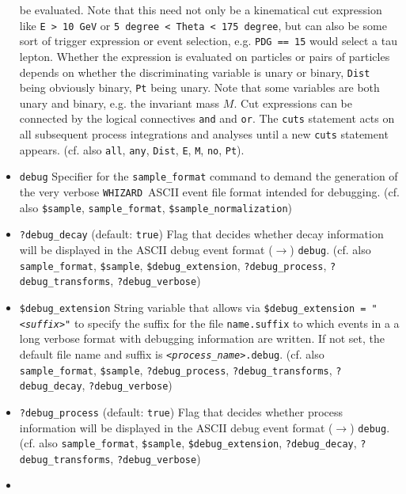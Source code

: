 \documentclass[12pt]{book}
\newcommand{\ttt}[1]{\texttt{#1}}
\newcommand{\whizard}{\texttt{WHIZARD}}
\begin{document}
\begin{itemize}
be evaluated. Note that this need not only be a kinematical cut
expression like \ttt{E > 10  GeV} or \ttt{5 degree < Theta < 175
  degree}, but can also be some sort of trigger expression or event
selection, e.g. \ttt{PDG == 15} would select a tau lepton.  Whether the
expression is evaluated on particles or pairs of particles depends on
whether the discriminating variable is unary or binary, \ttt{Dist}
being obviously binary, \ttt{Pt} being unary. Note that some variables
are both unary and binary, e.g. the invariant mass $M$. Cut
expressions can be connected by the logical  connectives \ttt{and} and
\ttt{or}. The \ttt{cuts} statement acts on all subsequent process
integrations and analyses until a new \ttt{cuts} statement appears.
(cf. also \ttt{all}, \ttt{any},
\ttt{Dist}, \ttt{E}, \ttt{M}, 
\ttt{no}, \ttt{Pt}).
\item
\ttt{debug} \newline 
Specifier for the \ttt{sample\_format} command to demand the
generation of the very verbose \whizard\ ASCII event
file format intended for debugging. (cf. also \ttt{\$sample}, 
\ttt{sample\_format}, \ttt{\$sample\_normalization}) 
\item
\ttt{?debug\_decay} \qquad (default: \ttt{true}) \newline
Flag that decides whether decay information will be displayed in the
ASCII debug event format ($\to$) \ttt{debug}. (cf. also \ttt{sample\_format},
\ttt{\$sample}, \ttt{\$debug\_extension}, \ttt{?debug\_process},
\ttt{?debug\_transforms}, \ttt{?debug\_verbose})  
\item
\ttt{\$debug\_extension} \newline
String variable that allows via \ttt{\$debug\_extension = "{\em <suffix>}"} to 
specify the suffix for the file \ttt{name.suffix} to which events in a
a long verbose format with debugging information are written. If not
set, the default file name and suffix is
\ttt{{\em <process\_name>}.debug}. (cf. also \ttt{sample\_format},
\ttt{\$sample}, \ttt{?debug\_process}, \ttt{?debug\_transforms},
\ttt{?debug\_decay}, \ttt{?debug\_verbose})  
\item
\ttt{?debug\_process} \qquad (default: \ttt{true}) \newline
Flag that decides whether process information will be displayed in the
ASCII debug event format ($\to$) \ttt{debug}. (cf. also \ttt{sample\_format},
\ttt{\$sample}, \ttt{\$debug\_extension}, \ttt{?debug\_decay},
\ttt{?debug\_transforms}, \ttt{?debug\_verbose})  
\item

\end{itemize}
\end{document}
